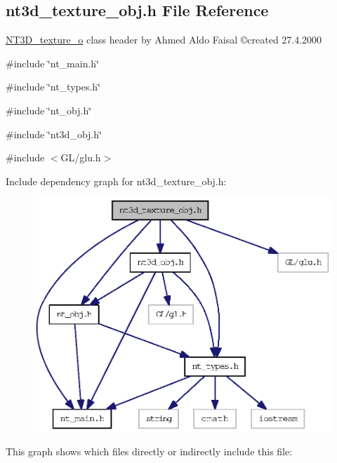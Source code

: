 \subsection{nt3d\_\-texture\_\-obj.h File Reference}
\label{nt3d__texture__obj_8h}



\begin{DoxyItemize}
\item \hyperlink{class_n_t3_d__texture__o}{NT3D\_\-texture\_\-o} class header by Ahmed Aldo Faisal \copyright created 27.4.2000 
\end{DoxyItemize} 


{\ttfamily \#include \char`\"{}nt\_\-main.h\char`\"{}}\par
{\ttfamily \#include \char`\"{}nt\_\-types.h\char`\"{}}\par
{\ttfamily \#include \char`\"{}nt\_\-obj.h\char`\"{}}\par
{\ttfamily \#include \char`\"{}nt3d\_\-obj.h\char`\"{}}\par
{\ttfamily \#include $<$GL/glu.h$>$}\par
Include dependency graph for nt3d\_\-texture\_\-obj.h:
\nopagebreak
\begin{figure}[H]
\begin{center}
\leavevmode
\includegraphics[width=369pt]{nt3d__texture__obj_8h__incl}
\end{center}
\end{figure}
This graph shows which files directly or indirectly include this file:
\nopagebreak
